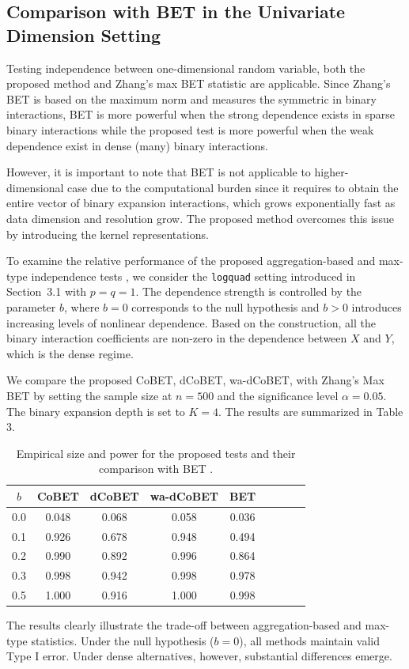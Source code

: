 \documentclass[12pt,reqno,oneside]{amsbook}
\theoremstyle{definition}
\theoremstyle{remark}
\begin{document}
\subsection{Comparison with BET \cite{zhang2019bet} in the Univariate Dimension Setting}

Testing independence between one-dimensional random variable, both the proposed method and Zhang's max BET \cite{zhang2019bet} statistic are applicable. Since Zhang's BET \cite{zhang2019bet} is based on the maximum norm and measures the symmetric in binary interactions, BET is more powerful when the strong dependence exists in sparse binary interactions while the proposed test is more powerful when the weak dependence exist in dense (many) binary interactions. 
    
However, it is important to note that BET \cite{zhang2019bet} is not applicable to higher-dimensional case due to the computational burden since it requires to obtain the entire vector of binary expansion interactions, which grows exponentially fast as data dimension and resolution grow. The proposed method overcomes this issue by introducing the kernel representations.

To examine the relative performance of the proposed aggregation-based and max-type independence tests \cite{zhang2019bet}, we consider the \texttt{logquad} setting introduced in Section~3.1 with $p=q=1$. The dependence strength is controlled by the parameter $b$, where $b=0$ corresponds to the null hypothesis and $b>0$ introduces increasing levels of nonlinear dependence. Based on the construction, all the binary interaction coefficients are non-zero in the dependence between $X$ and $Y$, which is the dense regime. 

We compare the proposed CoBET, dCoBET, wa-dCoBET, with Zhang's Max BET \cite{zhang2019bet} by setting the sample size at $n=500$ and the significance level $\alpha=0.05$. The binary expansion depth is set to $K=4$. The results are summarized in Table 3.
\begin{table}[ht]
\centering
\label{tab:dense_bet_comparison}
\begin{tabular}{ccccccccc}
\hline
 $b$ & CoBET & dCoBET & wa-dCoBET & BET \\
\hline
 0.0 & 0.048 & 0.068 & 0.058 & 0.036 \\
 0.1 & 0.926 & 0.678 & 0.948 & 0.494  \\
 0.2 & 0.990 & 0.892 & 0.996 & 0.864  \\
 0.3 & 0.998 & 0.942 & 0.998 & 0.978  \\
 0.5 & 1.000 & 0.916 & 1.000 & 0.998  \\
\hline
\end{tabular}
\caption{Empirical size and power for the proposed tests and their comparison with BET \cite{zhang2019bet}.}
\end{table}
The results clearly illustrate the trade-off between aggregation-based and max-type statistics. Under the null hypothesis ($b=0$), all methods maintain valid Type I error. Under dense alternatives, however, substantial differences emerge.
\end{document}
